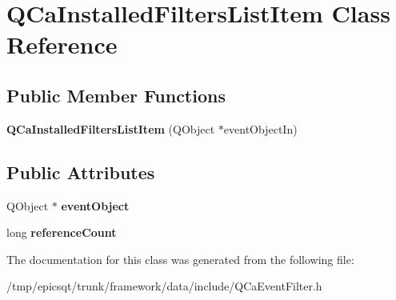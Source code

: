 \hypertarget{classQCaInstalledFiltersListItem}{
\section{QCaInstalledFiltersListItem Class Reference}
\label{classQCaInstalledFiltersListItem}
}
\subsection*{Public Member Functions}
\begin{DoxyCompactItemize}
\item 
\hypertarget{classQCaInstalledFiltersListItem_af038308cc602024e6e0b4edad60b3f54}{
{\bfseries QCaInstalledFiltersListItem} (QObject $\ast$eventObjectIn)}
\label{classQCaInstalledFiltersListItem_af038308cc602024e6e0b4edad60b3f54}

\end{DoxyCompactItemize}
\subsection*{Public Attributes}
\begin{DoxyCompactItemize}
\item 
\hypertarget{classQCaInstalledFiltersListItem_afa24ebf98d215be8b60c2a2798f8c8ee}{
QObject $\ast$ {\bfseries eventObject}}
\label{classQCaInstalledFiltersListItem_afa24ebf98d215be8b60c2a2798f8c8ee}

\item 
\hypertarget{classQCaInstalledFiltersListItem_ae8218df487c951690e0d783ee75bd6f3}{
long {\bfseries referenceCount}}
\label{classQCaInstalledFiltersListItem_ae8218df487c951690e0d783ee75bd6f3}

\end{DoxyCompactItemize}


The documentation for this class was generated from the following file:\begin{DoxyCompactItemize}
\item 
/tmp/epicsqt/trunk/framework/data/include/QCaEventFilter.h\end{DoxyCompactItemize}
